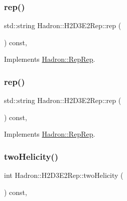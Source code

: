 \subsubsection{\texorpdfstring{rep()}{rep()}\hspace{0.1cm}{\footnotesize\ttfamily [2/3]}}
{\footnotesize\ttfamily std\+::string Hadron\+::\+H2\+D3\+E2\+Rep\+::rep (\begin{DoxyParamCaption}{ }\end{DoxyParamCaption}) const\hspace{0.3cm}{\ttfamily [inline]}, {\ttfamily [virtual]}}



Implements \mbox{\hyperlink{structHadron_1_1RepRep_ab3213025f6de249f7095892109575fde}{Hadron\+::\+Rep\+Rep}}.

\mbox{\label{structHadron_1_1H2D3E2Rep_a1e87b376344ff9529dd7f69395f739fa}} 
\subsubsection{\texorpdfstring{rep()}{rep()}\hspace{0.1cm}{\footnotesize\ttfamily [3/3]}}
{\footnotesize\ttfamily std\+::string Hadron\+::\+H2\+D3\+E2\+Rep\+::rep (\begin{DoxyParamCaption}{ }\end{DoxyParamCaption}) const\hspace{0.3cm}{\ttfamily [inline]}, {\ttfamily [virtual]}}



Implements \mbox{\hyperlink{structHadron_1_1RepRep_ab3213025f6de249f7095892109575fde}{Hadron\+::\+Rep\+Rep}}.

\mbox{\label{structHadron_1_1H2D3E2Rep_a85b69c72b8a1e18f12947d11de0e6561}} 
\subsubsection{\texorpdfstring{twoHelicity()}{twoHelicity()}\hspace{0.1cm}{\footnotesize\ttfamily [1/2]}}
{\footnotesize\ttfamily int Hadron\+::\+H2\+D3\+E2\+Rep\+::two\+Helicity (\begin{DoxyParamCaption}{ }\end{DoxyParamCaption}) const\hspace{0.3cm}{\ttfamily [inline]}, {\ttfamily [virtual]}}

